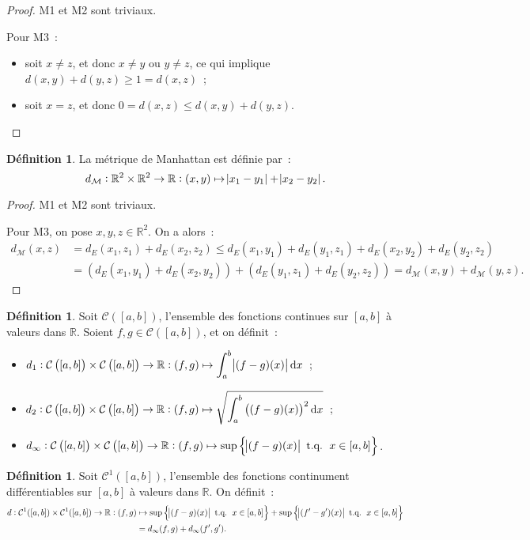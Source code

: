 \documentclass{report}
\theoremstyle{definition}
\newtheorem{déf}[thm]{Définition}
\theoremstyle{remark}
\DeclareMathOperator{\tq}{\text{ t.q. }}
\newcommand{\cont}[2]{\mathcal C\left(\left[#1, #2\right]\right)}
\newcommand{\R}{\mathbb R}
\begin{document}
		\begin{proof} M1 et M2 sont triviaux.

		Pour M3~:
		\begin{itemize}
			\item soit $x \neq z$, et donc $x \neq y$ ou $y \neq z$, ce qui implique $d(x, y) + d(y, z) \geq 1 = d(x, z)$~;
			\item soit $x = z$, et donc $0 = d(x, z) \leq d(x, y) + d(y, z)$.
		\end{itemize}
		\end{proof}

		\begin{déf} La métrique de Manhattan est définie par~:
		\[d_{\mathcal M} : \R^2 \times \R^2 \to \R : (x, y) \mapsto \abs {x_1 - y_1} + \abs {x_2 - y_2}.\]
		\end{déf}

		\begin{proof} M1 et M2 sont triviaux.

		Pour M3, on pose $x, y, z \in \R^2$. On a alors~:
		\begin{align*}
			d_{\mathcal M}(x, z) &= d_E(x_1, z_1) + d_E(x_2, z_2) \leq d_E(x_1, y_1) + d_E(y_1, z_1) + d_E(x_2, y_2) + d_E(y_2, z_2) \\
			&= \left(d_E(x_1, y_1) + d_E(x_2, y_2)\right) + \left(d_E(y_1, z_1) + d_E(y_2, z_2)\right) = d_{\mathcal M}(x, y) + d_{\mathcal M}(y, z).
		\end{align*}
		\end{proof}

		\begin{déf} Soit $\cont ab$, l'ensemble des fonctions continues sur $[a, b]$ à valeurs dans $\R$. Soient $f, g \in \cont ab$, et on définit~:
		\begin{itemize}
			\item $d_1 : \cont ab \times \cont ab \to \R : (f, g) \mapsto \displaystyle\int_a^b\abs {(f-g)(x)}\dif x$~;
			\item $d_2 : \cont ab \times \cont ab \to \R : (f, g) \mapsto \displaystyle\sqrt{\int_a^b\left((f-g)(x)\right)^2\dif x}$~;
			\item $d_\infty : \cont ab \times \cont ab \to \R : (f, g) \mapsto \sup\left\{\abs {(f-g)(x)} \tq x \in [a, b]\right\}$.
		\end{itemize}
		\end{déf}

		\begin{déf} Soit $\mathcal C^1([a, b])$, l'ensemble des fonctions continument différentiables sur $[a, b]$ à valeurs dans $\R$. On définit~:
		\begin{align*}
			d : \mathcal C^1([a, b]) \times \mathcal C^1([a, b]) \to \R : (f, g) &\mapsto
			\sup\left\{\abs {(f-g)(x)} \tq x \in [a, b]\right\} + \sup\left\{\abs {(f'-g')(x)} \tq x \in [a, b]\right\} \\
			&= d_\infty(f, g) + d_\infty(f', g').
		\end{align*}
		\end{déf}
\end{document}
